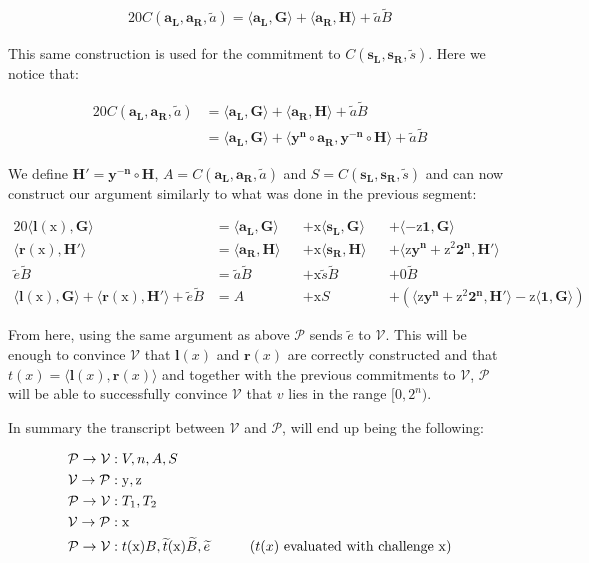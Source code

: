 \documentclass{article}
\newcommand{\eq}[1]{\begin{alignat*}{20}#1\end{alignat*}}
\renewcommand{\vec}[1]{\boldsymbol{#1}}
\newcommand{\ran}[1]{\mathrm{#1}}
\newcommand{\vecran}[1]{\mathbf{#1}}
\newcommand{\V}{\mathcal{V}}
\renewcommand{\P}{\mathcal{P}}
\newcommand{\dotp}[2]{\langle #1, #2 \rangle}
\newcommand{\opn}[1]{\operatorname{#1}}
\newcommand{\vecl}[1]{\vec{#1_{\opn{L}}}}
\newcommand{\vecr}[1]{\vec{#1_{\opn{R}}}}
\newcommand{\tB}{\widetilde{B}}
\renewcommand{\tt}{\widetilde{t}}
\begin{document}
\eq{
	C(\vecl{a}, \vecr{a}, \widetilde{a}) = \dotp{\vecl{a}}{\vec{G}} + \dotp{\vecr{a}}{\vec{H}} + \widetilde{a}\tB
}

This same construction is used for the commitment to $C(\vecl{s},
\vecr{s}, \widetilde{s})$. Here we notice that:

\eq{
	C(\vecl{a}, \vecr{a}, \widetilde{a}) &= \dotp{\vecl{a}}{\vec{G}} + \dotp{\vecr{a}}{\vec{H}} + \widetilde{a}\tB \\
	&= \dotp{\vecl{a}}{\vec{G}} + \dotp{\vecran{y^n}\circ \vecr{a}}{\vecran{y^{-n}}\circ \vec{H}} + \widetilde{a}\tB
}

We define $\vec{H'} = \vecran{y^{-n}}\circ\vec{H}$, $A =
C(\vecl{a},\vecr{a}, \widetilde{a})$ and $S = C(\vecl{s}, \vecr{s},
\widetilde{s})$ and can now construct our argument similarly to what
was done in the previous segment:

\eq{
	\dotp{\vec{l}(\ran{x})}{\vec{G}} &= \dotp{\vecl{a}}{\vec{G}} &&+ \ran{x}\dotp{\vecl{s}}{\vec{G}} &&+ \dotp{-\ran{z}\vec{1}}{\vec{G}} \\
	\dotp{\vec{r}(\ran{x})}{\vec{H'}} &= \dotp{\vecr{a}}{\vec{H}} &&+ \ran{x}\dotp{\vecr{s}}{\vec{H}} &&+ \dotp{\ran{z}\vecran{y^n} + \ran{z^2}\vec{2^n}}{\vec{H'}}\\
	\widetilde{e}\tB &= \widetilde{a}\tB &&+ \ran{x}\widetilde{s}\tB &&+ 0 \tB \\
	\dotp{\vec{l}(\ran{x})}{\vec{G}} + \dotp{\vec{r}(\ran{x})}{\vec{H'}} + \widetilde{e}\tB &= A &&+ \ran{x}S &&+ (\dotp{\ran{z}\vecran{y^n} + \ran{z^2}\vec{2^n}}{\vec{H'}} - \ran{z}\dotp{\vec{1}}{\vec{G}})
}

From here, using the same argument as above $\P$ sends $\widetilde{e}$
to $\V$. This will be enough to convince $\V$ that $\vec{l}(x)$
and $\vec{r}(x)$ are correctly constructed and that $t(x) =
\dotp{\vec{l}(x)}{\vec{r}(x)}$ and together with the previous
commitments to $\V$, $\P$ will be able to successfully convince $\V$
that $v$ lies in the range $[0, 2^n)$.

In summary the transcript between $\V$ and $\P$, will end up being
the following:

\eq{
	\P \rightarrow \V &: V, n, A, S \\
	\V \rightarrow \P &: \ran{y}, \ran{z} \\
	\P \rightarrow \V &: T_1, T_2 \\
	\V \rightarrow \P &: \ran{x} \\
	\P \rightarrow \V &: t(\ran{x})B, \tt(\ran{x})\tB, \widetilde{e} \hspace*{1cm}\text{($t(x)$ evaluated with challenge $\ran{x}$)}\\
}
\end{document}
